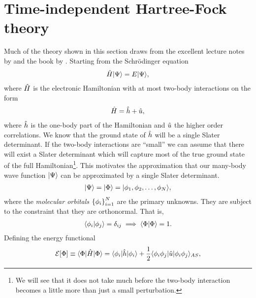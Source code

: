     \section{Time-independent Hartree-Fock theory}
        Much of the theory shown in this section draws from the excellent
        lecture notes by \citeauthor{kvaal2017notes} \cite{kvaal2017notes} and
        the book  by \citeauthor{szabo1996modern}
        \cite{szabo1996modern}.
        Starting from the Schrödinger equation
        \begin{align}
            \hat{H}| \Psi \rangle = E| \Psi \rangle,
        \end{align}
        where $\hat{H}$ is the electronic Hamiltonian with at most two-body
        interactions on the form
        \begin{align}
            \hat{H} = \hat{h} + \hat{u},
        \end{align}
        where $\hat{h}$ is the one-body part of the Hamiltonian and
        $\hat{u}$ the higher order correlations.
        We know that the ground state of $\hat{h}$ will be a single Slater
        determinant.
        If the two-body interactions are ``small'' we can assume that there will
        exist a Slater determinant which will capture most of the true ground
        state of the full Hamiltonian\footnote{We will see that it does not take
        much before the two-body interaction becomes a little more than just a
        small perturbation.}.
        This motivates the approximation that our many-body wave function
        $| \Psi \rangle$ can be approximated by a single Slater determinant.
        \begin{align}
            | \Psi \rangle = | \Phi \rangle = | \phi_1, \phi_2, \dots, \phi_N \rangle,
        \end{align}
        where the \emph{molecular orbitals} $\left\{ \phi_i \right\}_{i = 1}^{N}$ are the
        primary unknowns.
        They are subject to the constraint that they are orthonormal.
        That is,
        \begin{align}
            \langle \phi_i | \phi_j \rangle = \delta_{ij}
            \implies \langle \Phi | \Phi \rangle = 1.
        \end{align}
        Defining the energy functional
        \begin{align}
            \mathcal{E}[\Phi]
            \equiv \langle \Phi |\hat{H}| \Phi \rangle
            =
            \langle \phi_i |\hat{h}| \phi_i \rangle
            + \frac{1}{2}\langle \phi_i\phi_j |\hat{u}| \phi_i\phi_j \rangle_{AS},
            \label{eq:energy_func_hf}
        \end{align}
